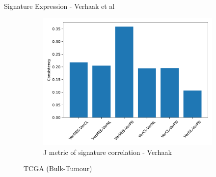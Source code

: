 \documentclass[aspectratio=169,9pt]{beamer}
\begin{document}
\begin{frame}{Signature Expression - Verhaak et al}
\begin{adjustwidth}{-5cm}{-5cm}
\begin{figure}
\begin{subfigure}[c]{0.4\textwidth}
                    \includegraphics[width=\textwidth]{TCGA_Consistency_Ver}
                    \caption{J metric of signature correlation - Verhaak}
                \end{subfigure}
                \caption{TCGA (Bulk-Tumour)}
            \end{figure}
        \end{adjustwidth}
    \end{frame}
\end{document}
